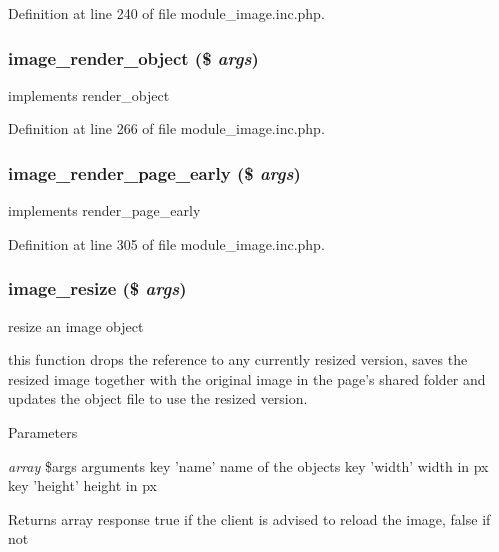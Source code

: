 Definition at line 240 of file module\_\-image.inc.php.

\hypertarget{module__image_8inc_8php_a4fadded2a225d1b5ea73404a84597620}{
\subsubsection[{image\_\-render\_\-object}]{\setlength{\rightskip}{0pt plus 5cm}image\_\-render\_\-object (\$ {\em args})}}
\label{module__image_8inc_8php_a4fadded2a225d1b5ea73404a84597620}
implements render\_\-object 

Definition at line 266 of file module\_\-image.inc.php.

\hypertarget{module__image_8inc_8php_a8266a74a11a86a73e2aa3709388fd43f}{
\subsubsection[{image\_\-render\_\-page\_\-early}]{\setlength{\rightskip}{0pt plus 5cm}image\_\-render\_\-page\_\-early (\$ {\em args})}}
\label{module__image_8inc_8php_a8266a74a11a86a73e2aa3709388fd43f}
implements render\_\-page\_\-early 

Definition at line 305 of file module\_\-image.inc.php.

\hypertarget{module__image_8inc_8php_a9e03a71310133176236ae0bd4a0241e0}{
\subsubsection[{image\_\-resize}]{\setlength{\rightskip}{0pt plus 5cm}image\_\-resize (\$ {\em args})}}
\label{module__image_8inc_8php_a9e03a71310133176236ae0bd4a0241e0}
resize an image object

this function drops the reference to any currently resized version, saves the resized image together with the original image in the page's shared folder and updates the object file to use the resized version. 
\begin{DoxyParams}{Parameters}
\item[{\em array}]\$args arguments key 'name' name of the objects key 'width' width in px key 'height' height in px \end{DoxyParams}
\begin{DoxyReturn}{Returns}
array response true if the client is advised to reload the image, false if not 
\end{DoxyReturn}



